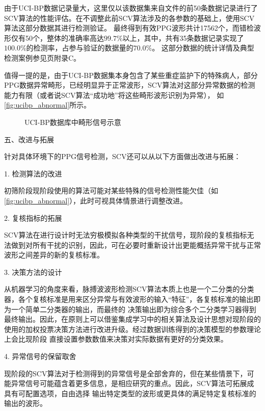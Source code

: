 由于UCI-BP数据记录量大，这里仅以该数据集来自文件的前50条数据记录进行了SCV算法的性能评估。在不调整此前SCV算法涉及的各参数的基础上，使用SCV算法这部分数据其进行检测验证。
最终得到有效PPG波形共计17562个，而错检波形仅有50个，整体的准确率高达$99.7\%$以上，其中，共有35条数据记录实现了$100.0\%$的检测率，占参与验证的数据量的$70.0\%$。
这部分数据的统计详情及典型检测案例参见\pageref{tab:ucibp_details}页附录C。

值得一提的是，由于UCI-BP数据集本身包含了某些重症监护下的特殊病人，部分PPG数据异常畸形，已经明显异于正常波形，SCV算法对这部分异常数据的检测能力有限（或者说SCV算法“成功地”将这些畸形波形识别为异常），
如\autoref{fig:ucibp_abnormal}所示。
\begin{figure}[h]
    \centering
    \quad
    \quad
    \caption{\label{fig:ucibp_abnormal}UCI-BP数据库中畸形信号示意}
\end{figure}

五、改进与拓展

针对具体环境下的PPG信号检测，SCV还可以从以下方面做出改进与拓展：

1. 检测算法的改进

初筛阶段现阶段使用的算法可能对某些特殊的信号检测性能欠佳（如\autoref{fig:ucibp_abnormal}），此时可视具体情景进行调整改进。

2. 复核指标的拓展

SCV算法在进行设计时无法穷极模拟各种类型的干扰信号，现阶段的复核指标无法做到对所有干扰的识别，因此，可在必要时重新设计出更能概括异常干扰与正常波形之间差异的新的复核标准。

3. 决策方法的设计

从机器学习的角度来看，脉搏波波形检测SCV算法本质上也是一个二分类的分类器，各个复核标准是用来区分异常与有效波形的输入“特征”，各复核标准的输出即为一个简单二分类器的输出，而最终的
决策输出即为综合多个二分类学习器得到最终输出。因此，在原则上可以借鉴集成学习中的相关算法及设计思想对现阶段的使用的加权投票决策方法进行改进升级。经过数据训练得到的决策模型的参数理论上会比现阶段
直接设置参数数值来决策对实际数据有更好的分类效果。

4. 异常信号的保留取舍

现阶段的SCV算法对于检测得到的异常信号是全部舍弃的，但在某些情景下，可能异常信号可能蕴含着更多信息，是相应研究的重点。因此，SCV算法可拓展成具有可配置选项，自由选择
输出特定类型的波形或更具体的满足特定复核标准的输出的波形。

